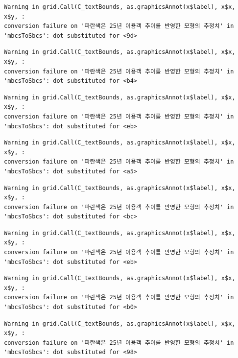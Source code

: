 \documentclass[
  letterpaper,
  DIV=11,
  numbers=noendperiod]{scrreprt}
\begin{document}
\begin{verbatim}
Warning in grid.Call(C_textBounds, as.graphicsAnnot(x$label), x$x, x$y, :
conversion failure on '파란색은 25년 이용객 추이를 반영한 모형의 추정치' in
'mbcsToSbcs': dot substituted for <9d>
\end{verbatim}

\begin{verbatim}
Warning in grid.Call(C_textBounds, as.graphicsAnnot(x$label), x$x, x$y, :
conversion failure on '파란색은 25년 이용객 추이를 반영한 모형의 추정치' in
'mbcsToSbcs': dot substituted for <b4>
\end{verbatim}

\begin{verbatim}
Warning in grid.Call(C_textBounds, as.graphicsAnnot(x$label), x$x, x$y, :
conversion failure on '파란색은 25년 이용객 추이를 반영한 모형의 추정치' in
'mbcsToSbcs': dot substituted for <eb>
\end{verbatim}

\begin{verbatim}
Warning in grid.Call(C_textBounds, as.graphicsAnnot(x$label), x$x, x$y, :
conversion failure on '파란색은 25년 이용객 추이를 반영한 모형의 추정치' in
'mbcsToSbcs': dot substituted for <a5>
\end{verbatim}

\begin{verbatim}
Warning in grid.Call(C_textBounds, as.graphicsAnnot(x$label), x$x, x$y, :
conversion failure on '파란색은 25년 이용객 추이를 반영한 모형의 추정치' in
'mbcsToSbcs': dot substituted for <bc>
\end{verbatim}

\begin{verbatim}
Warning in grid.Call(C_textBounds, as.graphicsAnnot(x$label), x$x, x$y, :
conversion failure on '파란색은 25년 이용객 추이를 반영한 모형의 추정치' in
'mbcsToSbcs': dot substituted for <eb>
\end{verbatim}

\begin{verbatim}
Warning in grid.Call(C_textBounds, as.graphicsAnnot(x$label), x$x, x$y, :
conversion failure on '파란색은 25년 이용객 추이를 반영한 모형의 추정치' in
'mbcsToSbcs': dot substituted for <b0>
\end{verbatim}

\begin{verbatim}
Warning in grid.Call(C_textBounds, as.graphicsAnnot(x$label), x$x, x$y, :
conversion failure on '파란색은 25년 이용객 추이를 반영한 모형의 추정치' in
'mbcsToSbcs': dot substituted for <98>
\end{verbatim}
\end{document}
